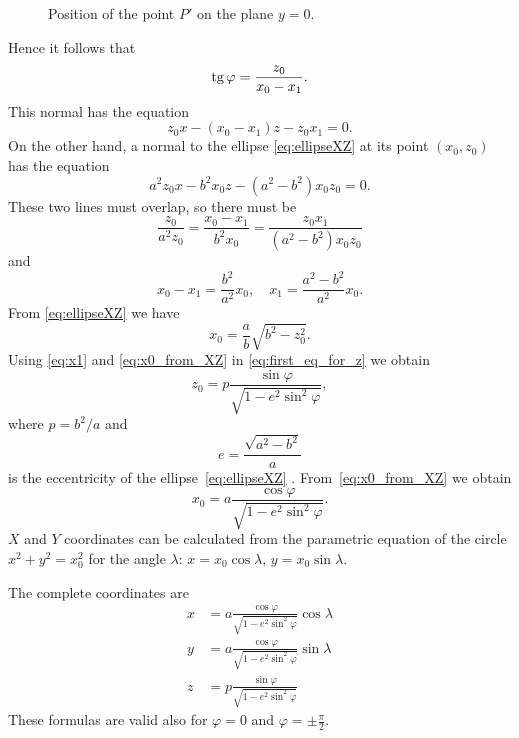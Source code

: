 \begin{figure}[ht]
\begin{center}
\end{center}
\caption{Position of the point $P'$ on the plane $y = 0$.}
\label{fig:plane_y_0}
\end{figure}

\noindent Hence it follows that
\begin{equation} \label{eq:first_eq_for_z}
  \operatorname{tg} \varphi = \frac{z_0}{x_0 - x_1}.
\end{equation}
This normal has the equation
\[
z_0x - (x_0 - x_1)z - z_0x_1 = 0.
\]
On the other hand, a normal to the ellipse \eqref{eq:ellipseXZ} at its
point $(x_0, z_0)$ has the equation \cite [pp.~215,~244]
{bronsztejn-siemiendiajew-musiol-muhlig-2004}
\[
a^2z_0x - b^2x_0z - (a^2 - b^2)x_0z_0 = 0.
\]
These two lines must overlap, so there must be
\[
\frac{z_0}{a^2z_0} = \frac{x_0 - x_1}{b^2x_0} = \frac{z_0x_1}{(a^2 -
  b^2)x_0z_0}
\]
and
\begin{equation} \label{eq:x1}
  x_0 - x_1 = \frac{b^2}{a^2}x_0, \quad x_1 = \frac{a^2 -
    b^2}{a^2}x_0.
\end{equation}
From \eqref{eq:ellipseXZ} we have
\begin{equation} \label{eq:x0_from_XZ}
  x_0 = \frac{a}{b}\sqrt{b^2 - z_0^2}.
\end{equation}
Using \eqref{eq:x1} and \eqref{eq:x0_from_XZ} in
\eqref{eq:first_eq_for_z} we obtain
\[
z_0 = p \frac{\sin \varphi}{\sqrt{1 - e^2\sin^2 \varphi}},
\]
where $p = b^2 / a$ \cite [p.~214]
{bronsztejn-siemiendiajew-musiol-muhlig-2004} and
\[
e = \frac{\sqrt{a^2 - b^2}}{a}
\]
is the eccentricity of the ellipse~\eqref{eq:ellipseXZ} \cite [p.~214]
{bronsztejn-siemiendiajew-musiol-muhlig-2004}.
From~\eqref{eq:x0_from_XZ} we obtain
\[
x_0 = a \frac{\cos \varphi}{\sqrt{1 - e^2\sin^2 \varphi}}.
\]
$X$ and $Y$ coordinates can be calculated from the parametric equation
of the circle $x^2 + y^2 = x_0^2$ for the angle $\lambda$: $x = x_0
\cos \lambda$, $y = x_0 \sin \lambda$.

The complete coordinates are
\begin{align*}
  x &= a \frac{\cos \varphi}{\sqrt{1 - e^2\sin^2 \varphi}} \cos \lambda \\
  y &= a \frac{\cos \varphi}{\sqrt{1 - e^2\sin^2 \varphi}} \sin \lambda \\
  z &= p \frac{\sin \varphi}{\sqrt{1 - e^2\sin^2 \varphi}}
\end{align*}
These formulas are valid also for $\varphi = 0$ and $\varphi = \pm
\frac{\pi}{2}$.


